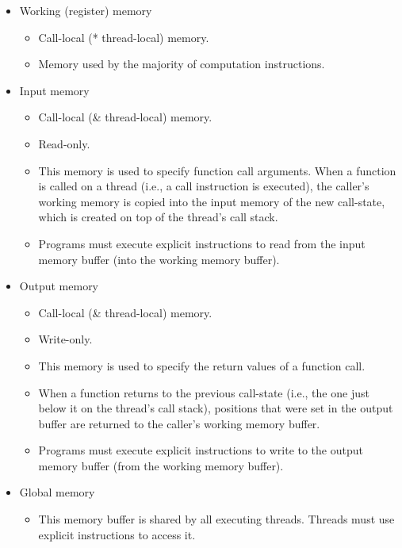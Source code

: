 \documentclass[]{book}
\providecommand{\tightlist}{%
  \setlength{\itemsep}{0pt}\setlength{\parskip}{0pt}}
\begin{document}
\begin{itemize}
\tightlist
\item
  Working (register) memory

  \begin{itemize}
  \tightlist
  \item
    Call-local (* thread-local) memory.
  \item
    Memory used by the majority of computation instructions.
  \end{itemize}
\item
  Input memory

  \begin{itemize}
  \tightlist
  \item
    Call-local (\& thread-local) memory.
  \item
    Read-only.
  \item
    This memory is used to specify function call arguments. When a function is called on a thread (i.e.,
    a call instruction is executed), the caller's working memory is copied into the input memory of
    the new call-state, which is created on top of the thread's call stack.
  \item
    Programs must execute explicit instructions to read from the input memory buffer (into the working
    memory buffer).
  \end{itemize}
\item
  Output memory

  \begin{itemize}
  \tightlist
  \item
    Call-local (\& thread-local) memory.
  \item
    Write-only.
  \item
    This memory is used to specify the return values of a function call.
  \item
    When a function returns to the previous call-state (i.e., the one just below it on the thread's
    call stack), positions that were set in the output buffer are returned to the caller's working memory
    buffer.
  \item
    Programs must execute explicit instructions to write to the output memory buffer (from the working
    memory buffer).
  \end{itemize}
\item
  Global memory

  \begin{itemize}
  \tightlist
  \item
    This memory buffer is shared by all executing threads. Threads must use explicit instructions to access it.
  \end{itemize}
\end{itemize}
\end{document}
